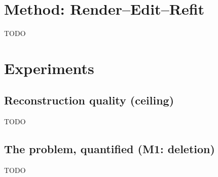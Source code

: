 \documentclass[11pt]{article}
\begin{document}
\section{Method: Render--Edit--Refit}
TODO

\section{Experiments}

\subsection{Reconstruction quality (ceiling)}
TODO

\subsection{The problem, quantified (M1: deletion)}
TODO
\end{document}
